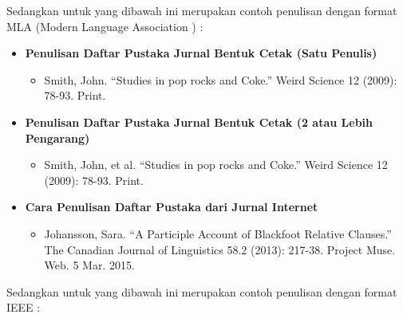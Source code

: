 \documentclass{article}
\begin{document}
Sedangkan untuk yang dibawah ini merupakan contoh penulisan dengan format MLA (Modern Language Association ) :

\begin{itemize}
    \item \textbf{Penulisan Daftar Pustaka Jurnal Bentuk Cetak (Satu Penulis)}
    \begin{itemize}
        \item Smith, John. “Studies in pop rocks and Coke.” Weird Science 12 (2009): 78-93. Print.
    \end{itemize}
    \item \textbf{Penulisan Daftar Pustaka Jurnal Bentuk Cetak (2 atau Lebih Pengarang)}
    \begin{itemize}
        \item Smith, John, et al. “Studies in pop rocks and Coke.” Weird Science 12 (2009): 78-93. Print.        
    \end{itemize}
    \item \textbf{Cara Penulisan Daftar Pustaka dari Jurnal Internet}
    \begin{itemize}
        \item Johansson, Sara. “A Participle Account of Blackfoot Relative Clauses.” The Canadian Journal of Linguistics 58.2 (2013): 217-38. Project Muse. Web. 5 Mar. 2015.
    \end{itemize}
\end{itemize}


Sedangkan untuk yang dibawah ini merupakan contoh penulisan dengan format IEEE :
\end{document}
